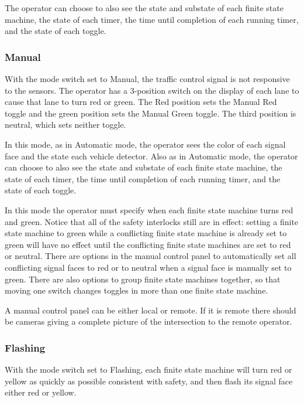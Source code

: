 \documentclass[letterpaper,twoside]{article}
\begin{document}
The operator can choose to also see the state and substate of each
finite state machine, the state of each timer, the time until completion
of each running timer, and the state of each toggle.

\subsubsection{Manual}

With the mode switch set to Manual, the traffic control signal is
not responsive to the sensors.  The operator has
a 3-position switch on the display of each lane to cause that lane to turn red
or green.  The Red position sets the Manual
Red toggle and the green position sets the Manual Green toggle.
The third position is neutral, which sets neither toggle.

In this mode, as in Automatic mode, the operator sees the color of
each signal face and the state each vehicle detector.
Also as in Automatic mode,
the operator can choose to also see the state and substate of each
finite state machine, the state of each timer, the time until completion
of each running timer, and the state of each toggle.

In this mode the operator must specify when each finite state machine turns
red and green.  Notice that all of the safety interlocks still
are in effect: setting a finite state machine to green while a conflicting
finite state machine is already set to green will have no effect until the
conflicting finite state machines are set to red or neutral.  There are
options in the manual control panel to automatically set all
conflicting signal faces to red or to neutral when a signal face
is manually set to green.  There are also options to group finite state
machines together, so that moving one switch changes toggles in
more than one finite state machine.

A manual control panel can be either local or remote.  If it is remote
there should be cameras giving a complete picture of the intersection
to the remote operator.

\subsubsection{Flashing}

With the mode switch set to Flashing, each finite state machine will
turn red or yellow as quickly as possible consistent with safety, and then
flash its signal face either red or yellow.
\end{document}
